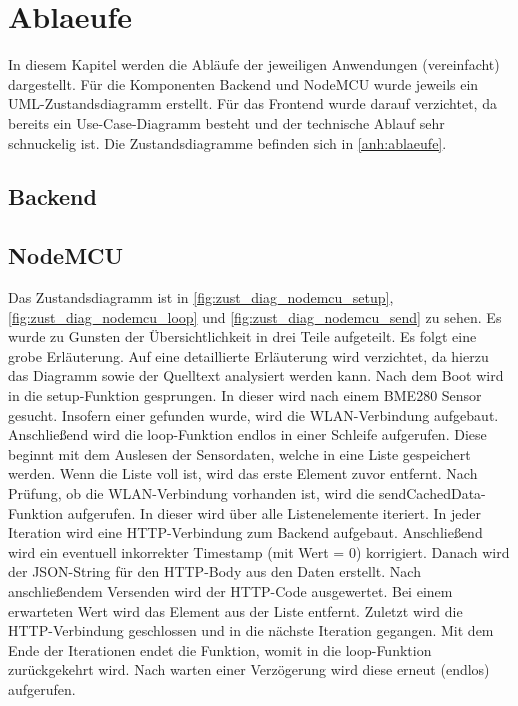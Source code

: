 \section{Ablaeufe}\label{Ablaeufe}
In diesem Kapitel werden die Abläufe der jeweiligen Anwendungen (vereinfacht) dargestellt. Für die Komponenten
Backend und NodeMCU wurde jeweils ein UML-Zustandsdiagramm erstellt. Für das Frontend wurde darauf verzichtet, da bereits
ein Use-Case-Diagramm besteht und der technische Ablauf sehr schnuckelig ist. Die Zustandsdiagramme befinden sich in
\autoref{anh:ablaeufe}.
\subsection{Backend}
\subsection{NodeMCU}
Das Zustandsdiagramm ist in \autoref{fig:zust_diag_nodemcu_setup}, \autoref{fig:zust_diag_nodemcu_loop} und
\autoref{fig:zust_diag_nodemcu_send} zu sehen. Es wurde zu Gunsten der Übersichtlichkeit in drei Teile aufgeteilt.
Es folgt eine grobe Erläuterung.
Auf eine detaillierte Erläuterung wird verzichtet, da hierzu das Diagramm sowie der Quelltext analysiert werden kann.
Nach dem Boot wird in die setup-Funktion gesprungen.
In dieser wird nach einem BME280 Sensor gesucht.
Insofern einer gefunden wurde, wird die WLAN-Verbindung aufgebaut.
Anschließend wird die loop-Funktion endlos in einer Schleife aufgerufen.
Diese beginnt mit dem Auslesen der Sensordaten, welche in eine Liste gespeichert werden.
Wenn die Liste voll ist, wird das erste Element zuvor entfernt.
Nach Prüfung, ob die WLAN-Verbindung vorhanden ist, wird die sendCachedData-Funktion aufgerufen.
In dieser wird über alle Listenelemente iteriert.
In jeder Iteration wird eine HTTP-Verbindung zum Backend aufgebaut.
Anschließend wird ein eventuell inkorrekter Timestamp (mit Wert = 0) korrigiert.
Danach wird der JSON-String für den HTTP-Body aus den Daten erstellt.
Nach anschließendem Versenden wird der HTTP-Code ausgewertet.
Bei einem erwarteten Wert wird das Element aus der Liste entfernt.
Zuletzt wird die HTTP-Verbindung geschlossen und in die nächste Iteration gegangen.
Mit dem Ende der Iterationen endet die Funktion, womit in die loop-Funktion zurückgekehrt wird.
Nach warten einer Verzögerung wird diese erneut (endlos) aufgerufen.
